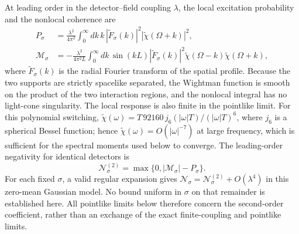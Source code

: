 \documentclass[pdflatex,sn-mathphys-num]{sn-jnl}
\begin{document}
At leading order in the detector--field coupling $\lambda$, the local excitation probability and the nonlocal coherence are
\begin{align}
P_\sigma&=\frac{\lambda^2}{4\pi^2}
\int_0^\infty dk\,k\,|\widetilde F_\sigma(k)|^2
|\widetilde\chi(\Omega+k)|^2,
\label{eq:pointlike-P}\\
\mathcal M_\sigma&=-\frac{\lambda^2}{4\pi^2L}
\int_0^\infty dk\,\sin(kL)|\widetilde F_\sigma(k)|^2
\widetilde\chi(\Omega-k)\widetilde\chi(\Omega+k),
\label{eq:pointlike-M}
\end{align}
where $\widetilde F_\sigma(k)$ is the radial Fourier transform of the spatial profile. Because the two supports are strictly spacelike separated, the Wightman function is smooth on the product of the two interaction regions, and the nonlocal integral has no light-cone singularity. The local response is also finite in the pointlike limit. For this polynomial switching, $\widetilde\chi(\omega)=T\,92160\,j_6(|\omega|T)/(|\omega|T)^6$, where $j_6$ is a spherical Bessel function; hence $\widetilde\chi(\omega)=O(|\omega|^{-7})$ at large frequency, which is sufficient for the spectral moments used below to converge. The leading-order negativity for identical detectors is
\begin{equation}
\mathcal N_\sigma^{(2)}=
\max\{0,|\mathcal M_\sigma|-P_\sigma\}.
\label{eq:pointlike-negativity}
\end{equation}
For each fixed $\sigma$, a valid regular expansion gives $\mathcal N_\sigma=\mathcal N_\sigma^{(2)}+O(\lambda^4)$ in this zero-mean Gaussian model. No bound uniform in $\sigma$ on that remainder is established here. All pointlike limits below therefore concern the second-order coefficient, rather than an exchange of the exact finite-coupling and pointlike limits.
\end{document}
